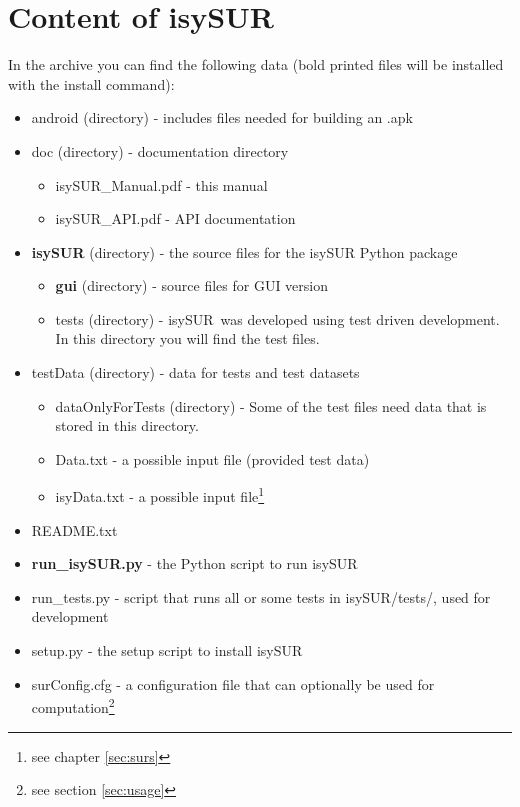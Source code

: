 \documentclass[11pt,fleqn]{book} %
\newcommand{\ProjectTitle}{isySUR}
\newcommand{\pt}{\ProjectTitle}
\begin{document}
\section{Content of \ProjectTitle}
In the archive you can find the following data (bold printed files will be installed with the install command):
\begin{itemize}
	\item android (directory) - includes files needed for building an .apk
	\item doc (directory) - documentation directory
	\begin{itemize}
		\item isySUR\_Manual.pdf - this manual
		\item isySUR\_API.pdf - API documentation
	\end{itemize}
	\item \textbf{isySUR} (directory) - the source files for the isySUR Python package
	\begin{itemize}
		\item \textbf{gui} (directory) - source files for GUI version
		\item tests (directory) - \pt\ was developed using test driven development. In this directory you will find the test files.
	\end{itemize}
	\item testData (directory) - data for tests and test datasets
	\begin{itemize}
		\item dataOnlyForTests (directory) - Some of the test files need data that is stored in this directory.
		\item Data.txt - a possible input file (provided test data)
		\item isyData.txt - a possible input file\footnote{see chapter \ref{sec:surs}}
	\end{itemize}
	\item README.txt
	\item \textbf{run\_isySUR.py} - the Python script to run \pt
	\item run\_tests.py - script that runs all or some tests in isySUR/tests/, used for development
	\item setup.py - the setup script to install \pt
	\item surConfig.cfg - a configuration file that can optionally be used for computation\footnote{see section \ref{sec:usage}}
\end{itemize}


\end{document}
